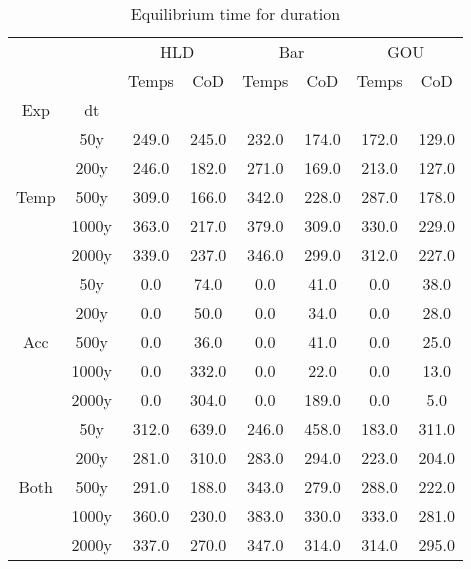 \begin{table}[h]
\centering
\caption{Equilibrium time for duration}
\label{table:5}
\begin{tabular}{cccccccc}
\toprule
{} & {} & \multicolumn{2}{c}{HLD} & \multicolumn{2}{c}{Bar} & \multicolumn{2}{c}{GOU} \\
{} & {} & {Temps} & {CoD} & {Temps} & {CoD} & {Temps} & {CoD} \\
{Exp} & {dt} & {} & {} & {} & {} & {} & {} \\
\midrule
\multirow[c]{5}{*}{Temp} & 50y & 249.0 & 245.0 & 232.0 & 174.0 & 172.0 & 129.0 \\
 & 200y & 246.0 & 182.0 & 271.0 & 169.0 & 213.0 & 127.0 \\
 & 500y & 309.0 & 166.0 & 342.0 & 228.0 & 287.0 & 178.0 \\
 & 1000y & 363.0 & 217.0 & 379.0 & 309.0 & 330.0 & 229.0 \\
 & 2000y & 339.0 & 237.0 & 346.0 & 299.0 & 312.0 & 227.0 \\
\multirow[c]{5}{*}{Acc} & 50y & 0.0 & 74.0 & 0.0 & 41.0 & 0.0 & 38.0 \\
 & 200y & 0.0 & 50.0 & 0.0 & 34.0 & 0.0 & 28.0 \\
 & 500y & 0.0 & 36.0 & 0.0 & 41.0 & 0.0 & 25.0 \\
 & 1000y & 0.0 & 332.0 & 0.0 & 22.0 & 0.0 & 13.0 \\
 & 2000y & 0.0 & 304.0 & 0.0 & 189.0 & 0.0 & 5.0 \\
\multirow[c]{5}{*}{Both} & 50y & 312.0 & 639.0 & 246.0 & 458.0 & 183.0 & 311.0 \\
 & 200y & 281.0 & 310.0 & 283.0 & 294.0 & 223.0 & 204.0 \\
 & 500y & 291.0 & 188.0 & 343.0 & 279.0 & 288.0 & 222.0 \\
 & 1000y & 360.0 & 230.0 & 383.0 & 330.0 & 333.0 & 281.0 \\
 & 2000y & 337.0 & 270.0 & 347.0 & 314.0 & 314.0 & 295.0 \\
\bottomrule
\end{tabular}
\end{table}
